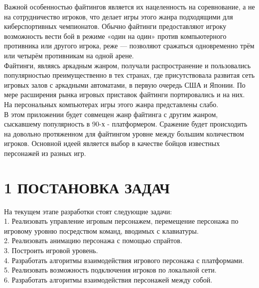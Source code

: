 \documentclass[14pt,a4paper]{extreport}
\begin{document}
\hspace{4ex}Важной особенностью файтингов является их нацеленность на соревнование, а не на сотрудничество игроков, что делает игры этого жанра подходящими для киберспортивных чемпионатов. Обычно файтинги предоставляют игроку возможность вести бой в режиме «один на один» против компьютерного противника или другого игрока, реже — позволяют сражаться одновременно трём или четырём противникам на одной арене.\\

\hspace{4ex}Файтинги, являясь аркадным жанром, получали распространение и пользовались популярностью преимущественно в тех странах, где присутствовала развитая сеть игровых залов с аркадными автоматами, в первую очередь США и Японии. По мере расширения рынка игровых приставок файтинги портировались и на них. На персональных компьютерах игры этого жанра представлены слабо.\\

	\hspace{4ex}В этом приложении будет совмещен жанр файтинга с другим  жанром, сыскавшему популярность в 90-х - платформером. Сражение будет происходить на довольно протяженном для файтингом уровне между большим количеством игроков. Основной идеей является выбор в качестве бойцов известных персонажей из разных игр.

	\newpage
	\section*{\normalsize\hspace{4ex}1 ПОСТАНОВКА ЗАДАЧ}
	\hspace{4ex}На текущем этапе разработки стоят следующие задачи:
	\\1. Реализовать управление игровым персонажем, перемещение персонажа по игровому уровню посредством команд, вводимых с клавиатуры. 
	\\2. Реализовать анимацию персонажа с помощью спрайтов. 
	\\3. Построить игровой уровень.
	\\4. Разработать алгоритмы взаимодействия игрового персонажа с платформами. 
	\\5. Реализовать возможность подключения игроков по локальной сети.
	\\6. Разработать алгоритмы взаимодействия персонажей между собой.

	\newpage
\end{document}
